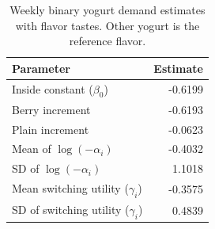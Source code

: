 \begin{table}[htbp]
\centering\small
\caption{Weekly binary yogurt demand estimates with flavor tastes. Other yogurt is the reference flavor.}
\label{tab:weekly-estimates}
\begin{tabular}{lr}
\toprule
Parameter & Estimate \\
\midrule
Inside constant ($\beta_0$) & -0.6199 \\
Berry increment & -0.6193 \\
Plain increment & -0.0623 \\
Mean of $\log(-\alpha_i)$ & -0.4032 \\
SD of $\log(-\alpha_i)$ & 1.1018 \\
Mean switching utility ($\gamma_i$) & -0.3575 \\
SD of switching utility ($\gamma_i$) & 0.4839 \\
\bottomrule
\end{tabular}
\end{table}
